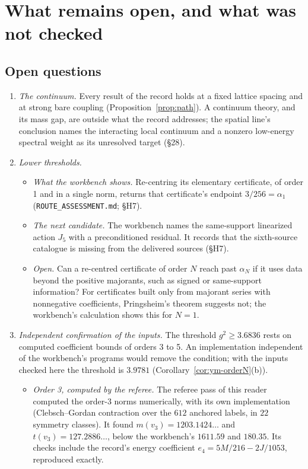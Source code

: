 \section{What remains open, and what was not checked}\label{sec:open}

\subsection{Open questions}

\begin{enumerate}[label=\arabic*.]
\item \emph{The continuum.} Every result of the record holds at a fixed lattice spacing and at strong bare coupling (Proposition~\ref{prop:path}). A continuum theory, and its mass gap, are outside what the record addresses; the spatial line's conclusion names the interacting local continuum and a nonzero low-energy spectral weight as its unresolved target (§28).
\item \emph{Lower thresholds.}
\begin{itemize}
\item \emph{What the workbench shows.} Re-centring its elementary certificate, of order 1 and in a single norm, returns that certificate's endpoint $3/256=\alpha_1$ (\texttt{ROUTE\_ASSESSMENT.md}; §H7).
\item \emph{The next candidate.} The workbench names the same-support linearized action $J_5$ with a preconditioned residual. It records that the sixth-source catalogue is missing from the delivered sources (§H7).
\item \emph{Open.} Can a re-centred certificate of order $N$ reach past $\alpha_N$ if it uses data beyond the positive majorants, such as signed or same-support information? For certificates built only from majorant series with nonnegative coefficients, Pringsheim's theorem suggests not; the workbench's calculation shows this for $N=1$.
\end{itemize}
\item \emph{Independent confirmation of the inputs.} The threshold $g^2\ge3.6836$ rests on computed coefficient bounds of orders 3 to 5. An implementation independent of the workbench's programs would remove the condition; with the inputs checked here the threshold is $3.9781$ (Corollary~\ref{cor:ym-orderN}(b)).
\begin{itemize}
\item \emph{Order 3, computed by the referee.} The referee pass of this reader computed the order-3 norms numerically, with its own implementation (Clebsch--Gordan contraction over the $612$ anchored labels, in $22$ symmetry classes). It found $m(v_3)=1203.1424\ldots$ and $t(v_3)=127.2886\ldots$, below the workbench's $1611.59$ and $180.35$. Its checks include the record's energy coefficient $e_4=5M/216-2J/1053$, reproduced exactly.

\end{itemize}
\end{enumerate}
